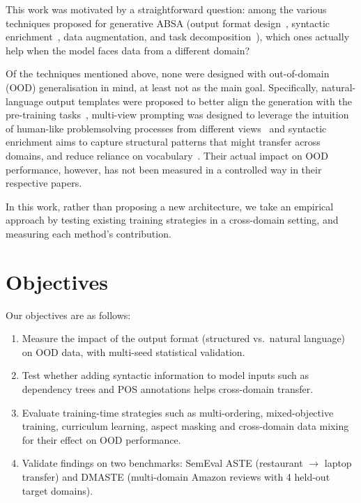 \documentclass[12pt,a4paper]{report}
\begin{document}
This work was motivated by a straightforward question: among the various techniques proposed for generative ABSA (output format design~\cite{zhang2021aspect}, syntactic enrichment~\cite{zhang2019aspect}, data augmentation, and task decomposition~\cite{xie2025star}), which ones actually help when the model faces data from a different domain?

Of the techniques mentioned above, none were designed with out-of-domain (OOD) generalisation in mind, at least not as the main goal. 
Specifically, natural-language output templates were proposed to better align the generation with the pre-training tasks~\cite{zhang2021aspect}, 
multi-view prompting was designed to leverage the intuition of human-like problemsolving processes from different views~\cite{gou2023mvp} and 
syntactic enrichment aims to capture structural patterns that might transfer across domains, and reduce reliance on vocabulary~\cite{zhang2019aspect}. 
Their actual impact on OOD performance, however, has not been measured in a controlled way in their respective papers.

In this work, rather than proposing a new architecture, we take an empirical approach by testing existing training strategies in a cross-domain setting, and measuring each method's contribution.

\section{Objectives}

Our objectives are as follows:

\begin{enumerate}
    \item Measure the impact of the output format (structured vs.\ natural language) on OOD data, with multi-seed statistical validation.

    \item Test whether adding syntactic information to model inputs such as dependency trees and POS annotations helps cross-domain transfer.

    \item Evaluate training-time strategies such as multi-ordering, mixed-objective training, curriculum learning, aspect masking and cross-domain data mixing for their effect on OOD performance.

    \item Validate findings on two benchmarks: SemEval ASTE (restaurant $\rightarrow$ laptop transfer) and DMASTE (multi-domain Amazon reviews with 4 held-out target domains).
\end{enumerate}
\end{document}
